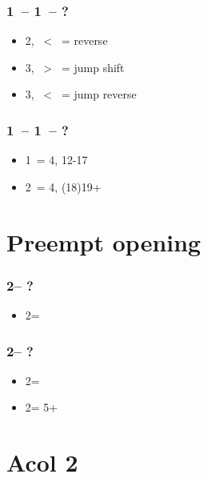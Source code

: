 \subsubsection*{1\ -- 1\ -- ?}
\begin{itemize}
    \item 2, \ < \ = reverse
    \item 3, \ > \ = jump shift
    \item 3, \ < \ = jump reverse
\end{itemize}

\subsubsection*{1\mins\ -- 1\hearts\ -- ?}
\begin{itemize}
    \item 1\spades\ = 4\spades, 12-17
    \item 2\spades\ = 4\spades, (18)19+
\end{itemize}

\section{\texorpdfstring{Preempt opening}{preemptOpening}}\label{sec:preemptOpening}

\subsubsection*{2\spades -- ?}
\begin{itemize}
    \item 2\nt = \lsf
\end{itemize}

\subsubsection*{2\hearts -- ?}
\begin{itemize}
    \item 2\spades = \lsf
    \item 2\nt = 5+\spades
\end{itemize}

\section{\texorpdfstring{Acol 2{\color{OliveGreen}\clubsuit}}{acol2c}}\label{sec:acol2c}

